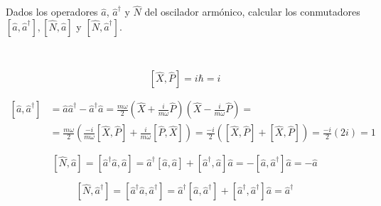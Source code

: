 Dados los operadores $\hat{a}$, $\hat{a}^{\dagger}$ y $\hat{N}$ del oscilador armónico, calcular los conmutadores $\left[\hat{a}, \hat{a}^{\dagger}\right],[\hat{N}, \hat{a}]$ y $[\hat{N}, \hat{a}^{\dagger}]$.

\begin{solution}\ \\

\begin{tcolorbox}
$$
[\hat{X}, \hat{P}] = i \hbar = i
$$
\end{tcolorbox}

$$
\begin{aligned}
\left[\hat{a}, \hat{a}^{\dagger}\right]&=\hat{a} \hat{a}^{\dagger}-\hat{a}^{\dagger} \hat{a}=\frac{m \omega}{2}\left(\hat{X}+\frac{i}{m \omega} \hat{P}\right)\left(\hat{X}-\frac{i}{m \omega} \hat{P}\right)=\\
&=\frac{m \omega}{2}\left(\frac{-i}{m \omega}[\hat{X}, \hat{P}]+\frac{i}{m \omega}[\hat{P}, \hat{X}]\right)=\frac{-i}{2}([\hat{X}, \hat{P}]+[\hat{X}, \hat{P}])=\frac{-i}{2}(2 i)=1
\end{aligned}
$$

$$
[\hat{N}, \hat{a}]=[\hat{a}^{\dagger}\hat{a}, \hat{a}]=\hat{a}^{\dagger}[\hat{a}, \hat{a}]+[\hat{a}^{\dagger}, \hat{a}] \hat{a}=-[\hat{a}, \hat{a}^{\dagger}] \hat{a}=-\hat{a}
$$

$$
\left[\hat{N}, \hat{a}^{\dagger} \right]=\left[\hat{a}^{\dagger} \hat{a}, \hat{a}^{\dagger}\right]=\hat{a}^{\dagger}\left[\hat{a}, \hat{a}^{\dagger}\right]+\left[\hat{a}^{\dagger}, \hat{a}^{\dagger}\right] \hat{a}=\hat{a}^{\dagger}
$$

\end{solution}